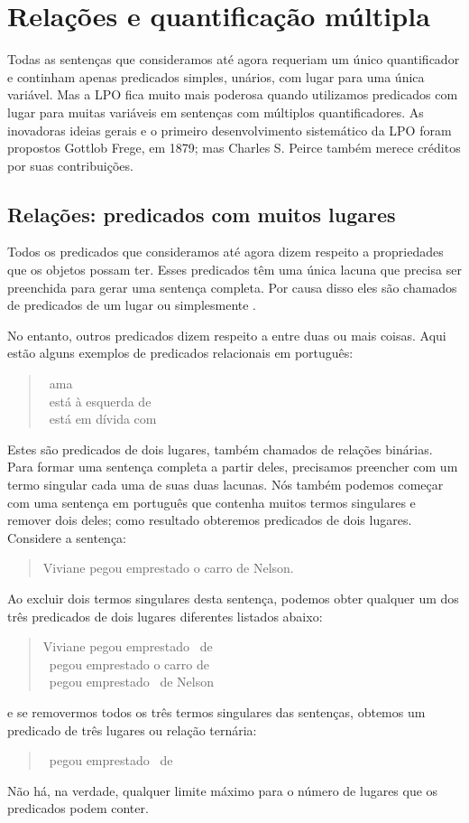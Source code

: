 \chapter{Relações e quantificação múltipla}\label{s:MultipleGenerality}
Todas as sentenças que consideramos até agora requeriam um único quantificador e continham apenas predicados simples, unários, com lugar para uma única variável. 
Mas a LPO fica muito mais poderosa quando utilizamos predicados com lugar para muitas variáveis em sentenças com múltiplos quantificadores.
As inovadoras ideias gerais e o primeiro desenvolvimento sistemático da LPO foram propostos \mbox{Gottlob} Frege, em 1879; mas Charles S. Peirce também merece créditos por suas contribuições.


\section{Relações: predicados com muitos lugares}
Todos os predicados que consideramos até agora dizem respeito a propriedades que os objetos possam ter.
Esses predicados têm uma única lacuna que precisa ser preenchida para gerar uma sentença completa.
Por causa disso eles são chamados de predicados de um lugar ou simplesmente .

No entanto, outros predicados dizem respeito a  entre duas ou mais coisas.
Aqui estão alguns exemplos de predicados relacionais em português:
	\begin{quote}
		\blank\ ama \blank\\
		\blank\ está à esquerda de \blank\\
		\blank\ está em dívida com \blank
	\end{quote}
Estes são predicados de dois lugares, também chamados de relações binárias.
Para formar uma sentença completa a partir deles, precisamos preencher com um termo singular cada uma de suas duas lacunas.
Nós também podemos começar com uma sentença em português que contenha muitos termos singulares e remover dois deles; como resultado obteremos predicados de dois lugares.
Considere a sentença:
\begin{quote}
	Viviane pegou emprestado o carro de Nelson.
\end{quote}
Ao excluir dois termos singulares desta sentença, podemos obter qualquer um dos  três predicados de dois lugares diferentes listados abaixo:
	\begin{quote}
		Viviane pegou emprestado \blank\ de \blank\\
		\blank\ pegou emprestado o carro de \blank\\
		\blank\ pegou emprestado \blank\ de Nelson
	\end{quote}
e se removermos todos os três termos singulares das sentenças, obtemos um predicado de três lugares ou relação ternária:
	\begin{quote}
		\blank\ pegou emprestado \blank\ de \blank
	\end{quote}
Não há, na verdade, qualquer limite máximo para o número de lugares que os predicados podem conter.

